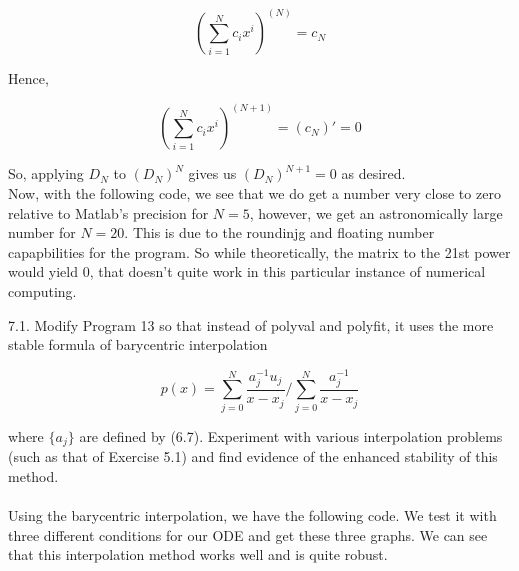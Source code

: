 \documentclass[12pt]{article}
\begin{document}
$$(\sum_{i=1}^Nc_ix^i)^{(N)}=c_N$$

Hence,

$$(\sum_{i=1}^Nc_ix^i)^{(N+1)}=(c_N)'=0$$

So, applying $D_N$ to $(D_N)^N$ gives us $(D_N)^{N+1}=0$ as desired.\\

Now, with the following code, we see that we do get a number very close to zero relative to Matlab's precision for
$N=5$, however, we get an astronomically large number for $N=20$. This is due to the roundinjg and floating number
capapbilities for the program. So while theoretically, the matrix to the 21st power would yield 0, that doesn't quite
work in this particular instance of numerical computing.

\newpage

\newpage

7.1. Modify Program 13 so that instead of polyval and polyfit, it uses the more stable formula of barycentric
interpolation

$$p(x)=\sum_{j=0}^N\frac{a_j^{-1}u_j}{x-x_j}/\sum_{j=0}^N\frac{a_j^{-1}}{x-x_j}$$

where $\{a_j\}$ are defined by (6.7). Experiment with various interpolation problems (such as that of Exercise 5.1)
and find evidence of the enhanced stability of this method.\\\\

Using the barycentric interpolation, we have the following code. We test it with three different conditions for our 
ODE and get these three graphs. We can see that this interpolation method works well and is quite robust.
\end{document}
